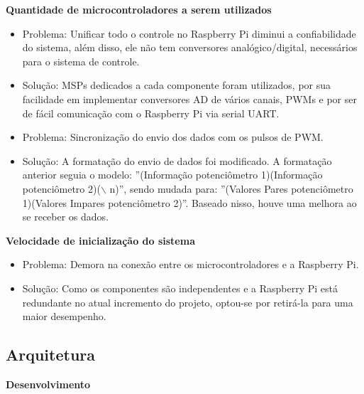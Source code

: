 \textbf{Quantidade de microcontroladores a serem utilizados}
  \begin{itemize}
    \item Problema: Unificar todo o controle no Raspberry Pi diminui a confiabilidade do sistema, além disso, ele não tem conversores analógico/digital, necessários para o sistema de controle.
  	\item Solução: MSPs dedicados a cada componente foram utilizados, por sua facilidade em implementar conversores AD de vários canais, PWMs e por ser de fácil comunicação com o Raspberry Pi via serial UART.

    \item Problema: Sincronização do envio dos dados com os pulsos de PWM.
    \item Solução: A formatação do envio de dados foi modificado. A formatação anterior seguia o modelo: ''(Informação potenciômetro 1)(Informação potenciômetro 2)($\backslash$ n)'', sendo mudada para: ''(Valores Pares potenciômetro 1)(Valores Impares potenciômetro 2)''. Baseado nisso, houve uma melhora ao se receber os dados.
  \end{itemize}

\textbf{Velocidade de inicialização do sistema}
  \begin{itemize}
    \item Problema: Demora na conexão entre os microcontroladores e a Raspberry Pi.
    \item Solução: Como os componentes são independentes e a Raspberry Pi está redundante no atual incremento do projeto, optou-se por retirá-la para uma maior desempenho.
  \end{itemize}

\subsection{Arquitetura}

\textbf{Desenvolvimento}


